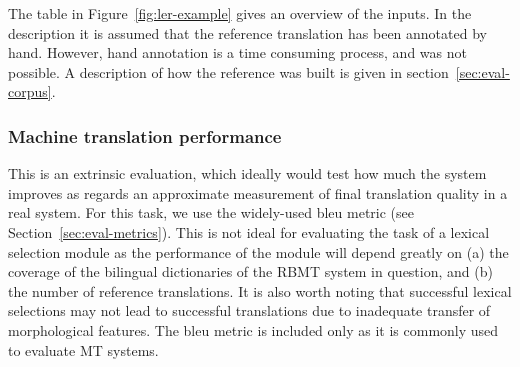 \documentclass[11pt]{article}
\newcommand{\comment}[1]{\todo{#1}}
\begin{document}


The table in Figure~\ref{fig:ler-example} gives an
overview of the inputs. In the description it is assumed that the
reference translation has been annotated by hand. However, hand
annotation is a time consuming process, and was not possible. A
description of how the reference was built is given in
section~\ref{sec:eval-corpus}.

\subsubsection{Machine translation performance} 
This is
an extrinsic evaluation, which ideally would test how much the system
improves as regards an approximate measurement of final translation
quality in a real system. For this task, we use the widely-used {\sc
  bleu} metric (see Section~\ref{sec:eval-metrics}). This is not ideal
for evaluating the task of a lexical selection module as the
performance of the module will depend greatly on (a) the coverage of
the bilingual dictionaries of the RBMT system in question, and (b) the
number of reference translations. It is also worth noting that
successful lexical selections may not lead to successful translations
due to inadequate transfer of morphological features. 
The {\sc bleu} metric \citep{papineni02} is
included only as it is commonly used to evaluate MT systems. 

\end{document}
